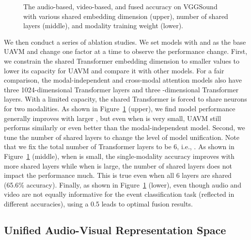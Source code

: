 \documentclass[journal]{IEEEtran}
\newcommand{\squeezeup}{\vspace{-1.6mm}}
\newcommand{\rev}[1]{{\color{dblue} #1}}
\begin{document}
\begin{figure}[t]
\squeezeup\squeezeup

\squeezeup\squeezeup

\vspace{-1.0em}
\caption{The audio-based, video-based, and fused accuracy on VGGSound with various shared embedding dimension  (upper), number of shared layers  (middle), and modality training weight  (lower).}
\label{fig:exp1}
\vspace{-1.5em}
\end{figure}

We then conduct a series of ablation studies. We set models with  and  as the base UAVM and change one factor at a time to observe the performance change. First, we constrain the shared Transformer embedding dimension  to smaller values to lower its capacity for UAVM and compare it with other models. For a fair comparison, the modal-independent and cross-modal attention models also have three 1024-dimensional Transformer layers and three -dimensional Transformer layers. With a limited capacity, the shared Transformer is forced to share neurons for two modalities. As shown in Figure~\ref{fig:exp1} (upper), we find model performance generally improves with larger , but even when  is very small, UAVM still performs similarly or even better than the modal-independent model. Second, we tune the number of shared layers  to change the level of model unification. Note that we fix the total number of Transformer layers to be 6, i.e., . As shown in Figure~\ref{fig:exp1} (middle), when  is small, the single-modality accuracy improves with more shared layers while when  is large, the number of shared layers does not impact the performance much. \rev{This is true even when all 6 layers are shared (65.6\% accuracy)}. Finally, as shown in Figure~\ref{fig:exp1} (lower), even though audio and video are not equally informative for the event classification task (reflected in different accuracies), using a 0.5  leads to optimal fusion results.

\squeezeup\squeezeup
\subsection{Unified Audio-Visual Representation Space}
\label{sec:exp2}
\end{document}

